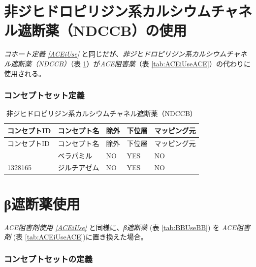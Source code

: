 \documentclass[
  11pt]{book}
\theoremstyle{definition}
\theoremstyle{definition}
\theoremstyle{definition}
\theoremstyle{definition}
\theoremstyle{remark}
\begin{document}
\section{非ジヒドロピリジン系カルシウムチャネル遮断薬（NDCCB）の使用}\label{ndCCBUse}

\emph{コホート定義 \ref{ACEiUse}} と同じだが、\emph{非ジヒドロピリジン系カルシウムチャネル遮断薬（NDCCB）}（表 \ref{tab:ndCCBUsendCCB}）が\emph{ACE阻害薬}（表 \ref{tab:ACEiUseACE}）の代わりに使用される。

\subsubsection*{コンセプトセット定義}\label{ux30b3ux30f3ux30bbux30d7ux30c8ux30bbux30c3ux30c8ux5b9aux7fa9-8}

\begin{longtable}[]{@{}lllll@{}}
\caption{\label{tab:ndCCBUsendCCB} 非ジヒドロピリジン系カルシウムチャネル遮断薬（NDCCB）}\tabularnewline
\toprule\noalign{}
コンセプトID & コンセプト名 & 除外 & 下位層 & マッピング元 \\
\midrule\noalign{}
\endfirsthead
\toprule\noalign{}
コンセプトID & コンセプト名 & 除外 & 下位層 & マッピング元 \\
\midrule\noalign{}
\endhead
\bottomrule\noalign{}
\endlastfoot
1307863 & ベラパミル & NO & YES & NO \\
1328165 & ジルチアゼム & NO & YES & NO \\
\end{longtable}

\section{β遮断薬使用}\label{BBUse}

\emph{ACE阻害剤使用 \ref{ACEiUse}} と同様に、\emph{β遮断薬} (表 \ref{tab:BBUseBB}) を \emph{ACE阻害剤} (表 \ref{tab:ACEiUseACE})に置き換えた場合。

\subsubsection*{コンセプトセットの定義}\label{ux30b3ux30f3ux30bbux30d7ux30c8ux30bbux30c3ux30c8ux306eux5b9aux7fa9-3}
\end{document}
